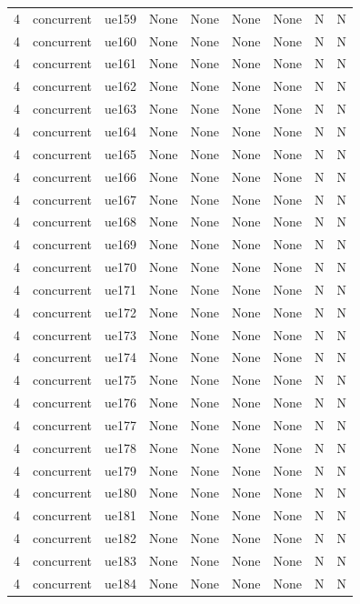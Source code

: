 \begin{table}[ht]
\begin{tabular}{|c|c|c|c|c|c|c|c|c|}
4 & concurrent & ue159 & None & None & None & None & N & N \\
4 & concurrent & ue160 & None & None & None & None & N & N \\
4 & concurrent & ue161 & None & None & None & None & N & N \\
4 & concurrent & ue162 & None & None & None & None & N & N \\
4 & concurrent & ue163 & None & None & None & None & N & N \\
4 & concurrent & ue164 & None & None & None & None & N & N \\
4 & concurrent & ue165 & None & None & None & None & N & N \\
4 & concurrent & ue166 & None & None & None & None & N & N \\
4 & concurrent & ue167 & None & None & None & None & N & N \\
4 & concurrent & ue168 & None & None & None & None & N & N \\
4 & concurrent & ue169 & None & None & None & None & N & N \\
4 & concurrent & ue170 & None & None & None & None & N & N \\
4 & concurrent & ue171 & None & None & None & None & N & N \\
4 & concurrent & ue172 & None & None & None & None & N & N \\
4 & concurrent & ue173 & None & None & None & None & N & N \\
4 & concurrent & ue174 & None & None & None & None & N & N \\
4 & concurrent & ue175 & None & None & None & None & N & N \\
4 & concurrent & ue176 & None & None & None & None & N & N \\
4 & concurrent & ue177 & None & None & None & None & N & N \\
4 & concurrent & ue178 & None & None & None & None & N & N \\
4 & concurrent & ue179 & None & None & None & None & N & N \\
4 & concurrent & ue180 & None & None & None & None & N & N \\
4 & concurrent & ue181 & None & None & None & None & N & N \\
4 & concurrent & ue182 & None & None & None & None & N & N \\
4 & concurrent & ue183 & None & None & None & None & N & N \\
4 & concurrent & ue184 & None & None & None & None & N & N \\

\end{tabular}
\end{table}
